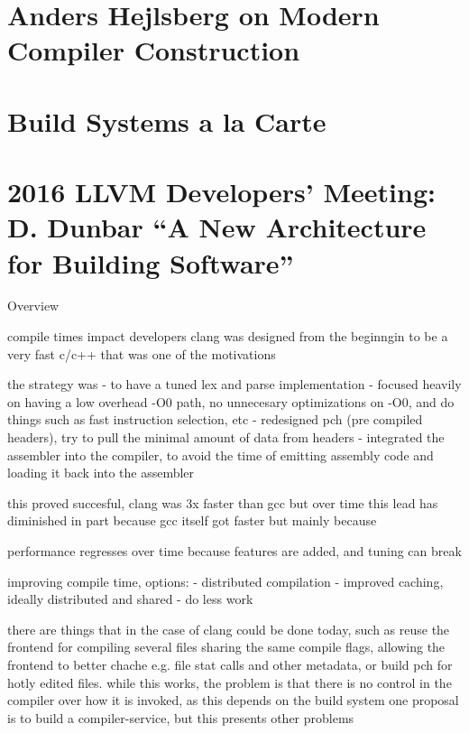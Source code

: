 \documentclass[12pt, a4paper]{report}
\begin{document}
\section*{Anders Hejlsberg on Modern Compiler Construction}

\cite{hejlsberg_modern_compiler_construction}

\section*{Build Systems a la Carte}

\cite{mokhov2018build}

\section*{2016 LLVM Developers’ Meeting: D. Dunbar “A New Architecture for Building Software”}

\cite{dunbar2016}

Overview

compile times impact developers
clang was designed from the beginngin to be a very fast c/c++
that was one of the motivations

the strategy was
- to have a tuned lex and parse implementation
- focused heavily on having a low overhead -O0 path, no unnecesary optimizations on -O0, and do things such as fast instruction selection, etc
- redesigned pch (pre compiled headers), try to pull the minimal amount of data from headers
- integrated the assembler into the compiler, to avoid the time of emitting assembly code and loading it back into the assembler

this proved succesful, clang was 3x faster than gcc
but over time this lead has diminished
in part because gcc itself got faster but mainly because

performance regresses over time because features are added, and tuning can break

improving compile time, options:
- distributed compilation
- improved caching, ideally distributed and shared
- do less work

there are things that in the case of clang could be done today, such as reuse the frontend for compiling several files sharing the same compile flags, allowing the frontend to better chache e.g. file stat calls and other metadata, or build pch for hotly edited files.
while this works, the problem is that there is no control in the compiler over how it is invoked, as this depends on the build system
one proposal is to build a compiler-service, but this presents other problems
\end{document}
